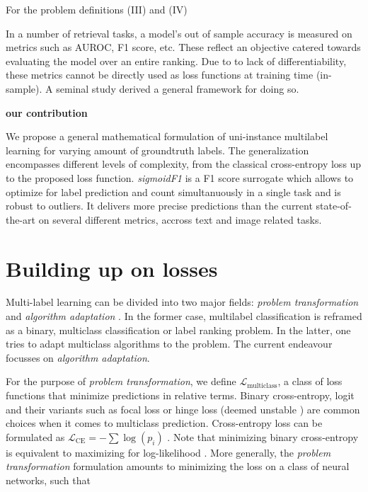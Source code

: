 \documentclass[sigconf,natbib,screen=true,review=true,anonymous]{acmart}
\begin{document}
For the problem definitions (III) and (IV)


In a number of retrieval tasks, a model's out of sample accuracy is measured on metrics such as AUROC, F1 score, etc. These reflect an objective catered towards evaluating the model over an entire ranking. Due to to lack of differentiability, these metrics cannot be directly used as loss functions at training time (in-sample). A seminal study \cite{optimizableLosses} derived a general framework for doing so. 

\textbf{\textbf{our contribution}}

We propose a general mathematical formulation of uni-instance multilabel learning for varying amount of groundtruth labels. The generalization encompasses different levels of complexity, from the classical cross-entropy loss up to the proposed loss function. \emph{sigmoidF1} is a F1 score surrogate which allows to optimize for label prediction and count simultanuously in a single task and is robust to outliers. It delivers more precise predictions than the current state-of-the-art on several different metrics, accross text and image related tasks.

\section{Building up on losses}
\label{sec:org47cc712}

Multi-label learning can be divided into two major fields: \emph{problem transformation} and \emph{algorithm adaptation} \cite{multilabelReview}. In the former case, multilabel classification is reframed as a binary, multiclass classification or label ranking problem. In the latter, one tries to adapt multiclass algorithms to the problem. The current endeavour focusses on \emph{algorithm adaptation}.


For the purpose of \emph{problem transformation}, we define \(\mathcal{L}_{\text {multiclass}}\), a class of loss functions that minimize predictions in relative terms. Binary cross-entropy, logit and their variants such as focal loss or hinge loss (deemed unstable \cite{focalLoss}) are common choices when it comes to multiclass prediction. Cross-entropy loss can be formulated as \(\mathcal{L}_{\text {CE}}=-\sum \log \left(p_{i}\right)\) . Note that minimizing binary cross-entropy is equivalent to maximizing for log-likelihood \cite[Section 4.3.4]{Bishop}. More generally, the \emph{problem transformation} formulation amounts to minimizing the loss on a class of neural networks, such that
\end{document}
